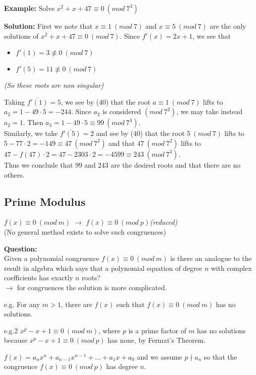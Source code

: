 \documentclass[a4paper]{article}
\begin{document}
\textbf{Example:}
Solve $x^2+x+47\equiv 0\ (mod\ 7^3)$

\textbf{Solution:}
First we note that $x\equiv 1\ (mod\ 7)$ and $x\equiv 5\ (mod\ 7)$ are the only solutions of $x^2+x+47\equiv 0\ (mod\ 7)$. Since $f'(x)=2x+1$, we see that
\begin{itemize}
    \item $f'(1)=3\not\equiv 0\ (mod\ 7)$
    \item $f'(5)=11\not\equiv 0\ (mod\ 7)$
\end{itemize}
\textit{(So these roots are non singular)}

Taking $\overline{f'(1)}=5$, we see by (40) that the root $a\equiv 1\ (mod\ 7)$ lifts to $a_2=1-49\cdot5=-244$. Since $a_2$ is considered $(mod\ 7^2)$, we may take instead $a_2=1$. Then $a_3=1-49\cdot5\equiv 99\ (mod\ 7^3)$.\\
Similarly, we take $\overline{f'(5)}=2$ and see by (40) that the root $5\ (mod\ 7)$ lifts to $5-77\cdot2=-149\equiv 47\ (mod\ 7^2)$ and that $47\ (mod\ 7^2)$ lifts to $47-f(47)\cdot2=47-2303\cdot2=-4599\equiv 243\ (mod\ 7^3)$.\\
Thus we conclude that $99$ and $243$ are the desired roots and that there are no others.


\subsection{Prime Modulus}

$f(x)\equiv 0\ (mod\ m)$ $\to$ $f(x)\equiv 0\ (mod\ p)$\quad \textit{(reduced)}\\
(No general method exists to solve such congruences)

\textbf{Question:}\\
Given a polynomial congruence $f(x)\equiv 0\ (mod\ m)$ is there an analogue to the result in algebra which says that a polynomial equation of degree $n$ with complex coefficients has exactly $n$ roots?\\
$\to$ for congruences the solution is more complicated.

e.g. For any $m>1$, there are $f(x)$ such that $f(x)\equiv 0\ (mod\ m)$ has no solutions.

e.g.2 $x^p-x+1\equiv 0\ (mod\ m)$, where $p$ is a prime factor of $m$ has no solutions because $x^p-x+1\equiv 0\ (mod\ p)$ has none, by Fermat's Theorem.

$f(x)=a_nx^n+a_{n-1}x^{n-1}+...+a_1x+a_0$ and we assume $p\nmid a_n$ so that the congruence $f(x)\equiv 0\ (mod\ p)$ has degree $n$.
\end{document}
